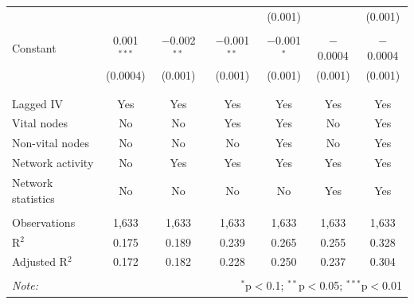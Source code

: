\begin{table}[!htbp]
\begin{tabular}{@{\extracolsep{5pt}}lcccccc}
 &  &  &  & (0.001) &  & (0.001) \\ 
 & & & & & & \\ 
 Constant & 0.001$^{***}$ & $-$0.002$^{**}$ & $-$0.001$^{**}$ & $-$0.001$^{*}$ & $-$0.0004 & $-$0.0004 \\ 
 & (0.0004) & (0.001) & (0.001) & (0.001) & (0.001) & (0.001) \\ 
 & & & & & & \\ 
 \hline \\[-1.8ex] 
 Lagged IV & Yes & Yes & Yes & Yes & Yes & Yes \\ 
 Vital nodes & No & No & Yes & Yes & No & Yes \\ 
 Non-vital nodes & No & No & No & Yes & No & Yes \\ 
 Network activity & No & Yes & Yes & Yes & Yes & Yes \\ 
 Network statistics & No & No & No & No & Yes & Yes \\ 
 \hline &  &  &  &  &  &  \\ 
 Observations & 1,633 & 1,633 & 1,633 & 1,633 & 1,633 & 1,633 \\ 
 R$^{2}$ & 0.175 & 0.189 & 0.239 & 0.265 & 0.255 & 0.328 \\ 
 Adjusted R$^{2}$ & 0.172 & 0.182 & 0.228 & 0.250 & 0.237 & 0.304 \\ 
\hline 
\hline \\[-1.8ex] 
\textit{Note:}  & \multicolumn{6}{r}{$^{*}$p$<$0.1; $^{**}$p$<$0.05; $^{***}$p$<$0.01} \\ 
\end{tabular} 
\end{table} 

